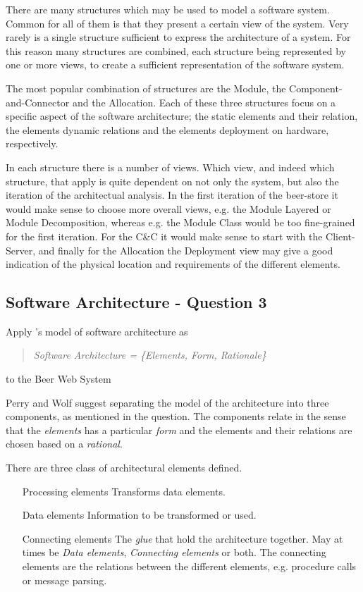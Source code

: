 There are many structures which may be used to model a software system. Common for all of them is that they present a certain view of the system. Very rarely is a single structure sufficient to express the architecture of a system. For this reason many structures are combined, each structure being represented by one or more views, to create a sufficient representation of the software system.

The most popular combination of structures are the Module, the Component-and-Connector and the Allocation. Each of these three structures focus on a specific aspect of the software architecture; the static elements and their relation, the elements dynamic relations and the elements deployment on hardware, respectively. 

In each structure there is a number of views. Which view, and indeed which structure, that apply is quite dependent on not only the system, but also the iteration of the architectual analysis. In the first iteration of the beer-store it would make sense to choose more overall views, e.g. the Module Layered or Module Decomposition, whereas e.g. the Module Class would be too fine-grained for the first iteration. For the C\&C it would make sense to start with the Client-Server, and finally for the Allocation the Deployment view may give a good indication of the physical location and requirements of the different elements.

\subsection{Software Architecture - Question 3}

\begin{question}
Apply \cite{perrywolf1992}'s model of software architecture as
\begin{quote}
	{\it Software Architecture = \{Elements, Form, Rationale\}}
\end{quote}
to the Beer Web System
\end{question}

Perry and Wolf suggest separating the model of the architecture into three components, as mentioned in the question. The components relate in the sense that the \emph{elements} has a particular \emph{form} and the elements and their relations are chosen based on a \emph{rational}.

There are three class of architectural elements defined.
\begin{itemize}
    \item[Processing elements] Transforms data elements.
    \item[Data elements] Information to be transformed or used.
    \item[Connecting elements] The \emph{glue} that hold the architecture together. May at times be \emph{Data elements}, \emph{Connecting elements} or both. The connecting elements are the relations between the different elements, e.g. procedure calls or message parsing.
\end{itemize}

